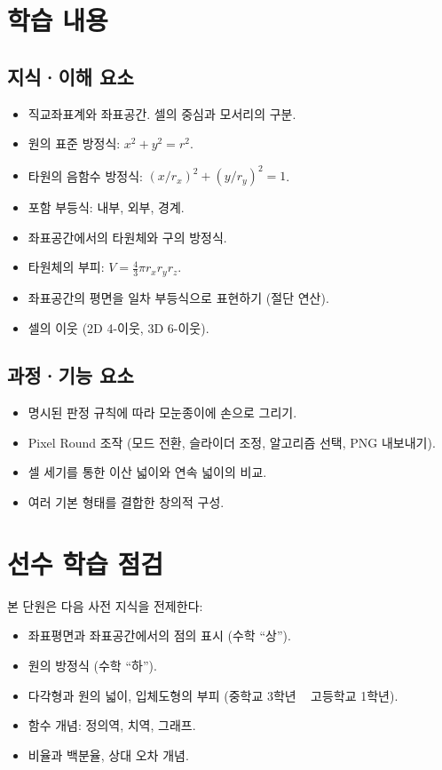 \documentclass[12pt,a4paper]{scrartcl}
\begin{document}
\section{학습 내용}

\subsection{지식·이해 요소}
\begin{itemize}[leftmargin=1.3em,itemsep=0.15em,topsep=0.3em]
  \item 직교좌표계와 좌표공간. 셀의 중심과 모서리의 구분.
  \item 원의 표준 방정식: $x^2 + y^2 = r^2$.
  \item 타원의 음함수 방정식: $(x/r_x)^2 + (y/r_y)^2 = 1$.
  \item 포함 부등식: 내부, 외부, 경계.
  \item 좌표공간에서의 타원체와 구의 방정식.
  \item 타원체의 부피: $V = \tfrac{4}{3}\pi r_x r_y r_z$.
  \item 좌표공간의 평면을 일차 부등식으로 표현하기 (절단 연산).
  \item 셀의 이웃 (2D 4-이웃, 3D 6-이웃).
\end{itemize}

\subsection{과정·기능 요소}
\begin{itemize}[leftmargin=1.3em,itemsep=0.15em,topsep=0.3em]
  \item 명시된 판정 규칙에 따라 모눈종이에 손으로 그리기.
  \item Pixel Round 조작 (모드 전환, 슬라이더 조정, 알고리즘 선택, PNG 내보내기).
  \item 셀 세기를 통한 이산 넓이와 연속 넓이의 비교.
  \item 여러 기본 형태를 결합한 창의적 구성.
\end{itemize}

\section{선수 학습 점검}

본 단원은 다음 사전 지식을 전제한다:

\begin{itemize}[leftmargin=1.3em,itemsep=0.15em,topsep=0.3em]
  \item 좌표평면과 좌표공간에서의 점의 표시 (수학 ``상'').
  \item 원의 방정식 (수학 ``하'').
  \item 다각형과 원의 넓이, 입체도형의 부피 (중학교 3학년 ~ 고등학교 1학년).
  \item 함수 개념: 정의역, 치역, 그래프.
  \item 비율과 백분율, 상대 오차 개념.
\end{itemize}
\end{document}
